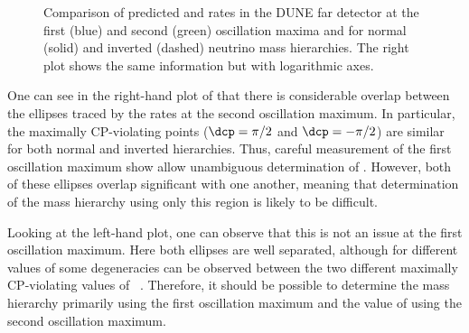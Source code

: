 \begin{figure}[h]
  \begin{minipage}[t]{0.5\textwidth}
    \begin{adjustbox}{max totalsize={\textwidth}, center}
      
    \end{adjustbox}
  \end{minipage}
  \hfill
  \begin{minipage}[t]{0.5\textwidth}
    \begin{adjustbox}{max totalsize={\textwidth}, center}
      
    \end{adjustbox}
  \end{minipage}
  \caption[Predicted \nue and \anue rates for different values of \dcp and neutrino mass hierarchies at the first and second oscillation maxima.]{Comparison of predicted \nue and \anue rates in the DUNE far detector at the first (blue) and second (green) oscillation maxima and for normal (solid) and inverted (dashed) neutrino mass hierarchies. The right plot shows the same information but with logarithmic axes.}
  \label{fig:nueRates}
\end{figure}

One can see in the right-hand plot of  that there is considerable overlap between the ellipses traced by the rates at the second oscillation maximum.
In particular, the maximally CP-violating points ($\dcp=\pi/2$ and $\dcp=-\pi/2$) are similar for both normal and inverted hierarchies.
Thus, careful measurement of the first oscillation maximum show allow unambiguous determination of \dcp.
However, both of these ellipses overlap significant with one another, meaning that determination of the mass hierarchy using only this region is likely to be difficult.

Looking at the left-hand plot, one can observe that this is not an issue at the first oscillation maximum.
Here both ellipses are well separated, although for different values of  some degeneracies can be observed between the two different maximally CP-violating values of \dcp~\cite{twoExperiments}.
Therefore, it should be possible to determine the mass hierarchy primarily using the first oscillation maximum and the value of \dcp using the second oscillation maximum.

